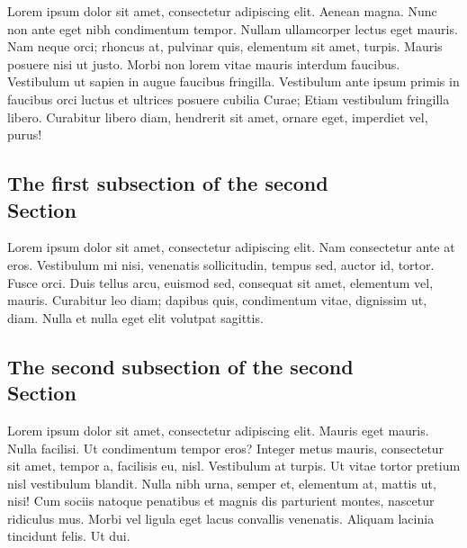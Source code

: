 \documentclass[a4paper,10pt]{article}
\begin{document}
\begin{multicols}{2}
Lorem ipsum dolor sit amet, consectetur adipiscing elit.  Aenean magna. Nunc non
ante eget nibh condimentum tempor. Nullam ullamcorper lectus eget mauris. Nam
neque orci; rhoncus at, pulvinar quis, elementum sit amet, turpis. Mauris
posuere nisi ut justo. Morbi non lorem vitae mauris interdum faucibus.
Vestibulum ut sapien in augue faucibus fringilla. Vestibulum ante ipsum primis
in faucibus orci luctus et ultrices posuere cubilia Curae; Etiam vestibulum
fringilla libero. Curabitur libero diam, hendrerit sit amet, ornare eget,
imperdiet vel, purus!


\subsection{The first subsection of the second \\ Section}

Lorem ipsum dolor sit amet, consectetur adipiscing elit. Nam consectetur ante at
eros. Vestibulum mi nisi, venenatis sollicitudin, tempus sed, auctor id, tortor.
Fusce orci. Duis tellus arcu, euismod sed, consequat sit amet, elementum vel,
mauris. Curabitur leo diam; dapibus quis, condimentum vitae, dignissim ut, diam.
Nulla et nulla eget elit volutpat sagittis.

\subsection{The second subsection of the second \\ Section}

Lorem ipsum dolor sit amet, consectetur adipiscing elit. Mauris eget mauris.
Nulla facilisi. Ut condimentum tempor eros? Integer metus mauris, consectetur
sit amet, tempor a, facilisis eu, nisl. Vestibulum at turpis. Ut vitae tortor
pretium nisl vestibulum blandit. Nulla nibh urna, semper et, elementum at,
mattis ut, nisi! Cum sociis natoque penatibus et magnis dis parturient montes,
nascetur ridiculus mus. Morbi vel ligula eget lacus convallis venenatis. Aliquam
lacinia tincidunt felis. Ut dui.




\end{multicols}
\end{document}
